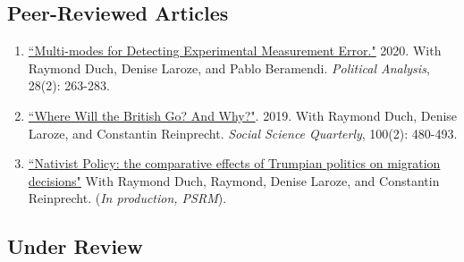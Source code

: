 \documentclass[11pt, a4paper]{article}
\begin{document}
 \subsection*{Peer-Reviewed Articles}

 \begin{enumerate}

 \item \href{https://www.cambridge.org/core/journals/political-analysis/article/multimodes-for-detecting-experimental-measurement-error/37514FC46CF29C7B345DB9881E252150/share/7b059037b0da9182a33316d7f87b2de81b619592}{``Multi-modes for Detecting Experimental Measurement Error."} 2020. With Raymond Duch, Denise Laroze, and Pablo Beramendi. \textit{Political Analysis}, 28(2): 263-283.

 \item \href{https://doi.org/10.1111/ssqu.12584}{``Where Will the British Go? And Why?"}. 2019. With Raymond Duch, Denise Laroze, and Constantin Reinprecht. \textit{Social Science Quarterly}, 100(2): 480-493. 

 \item \href{http://raymondduch.com/files/Populism__Magnet_or_Deterrent_May2019.pdf}{``Nativist Policy: the comparative effects of Trumpian politics on migration decisions"} With Raymond Duch, Raymond, Denise Laroze, and Constantin Reinprecht. (\textit{In production, PSRM}).


\end{enumerate}

\subsection*{Under Review}
\end{document}
